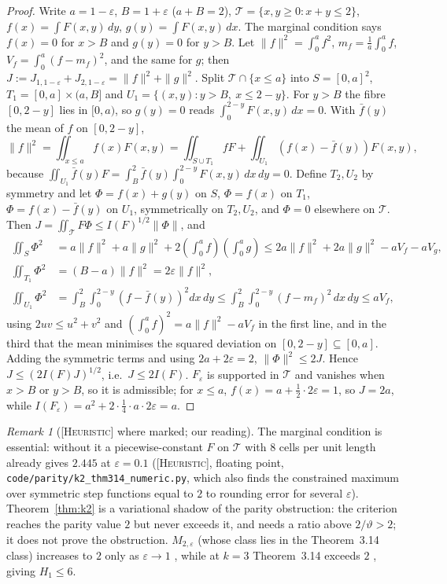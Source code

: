 \documentclass[11pt]{amsart}
\theoremstyle{definition}
\theoremstyle{remark}
\newtheorem{remark}[theorem]{Remark}
\newcommand{\lbl}[1]{\textup{\textsc{[#1]}}}
\begin{document}
\begin{proof}
Write $a=1-\varepsilon$, $B=1+\varepsilon$ ($a+B=2$), $\mathcal T=\{x,y\ge0:x+y\le2\}$,
$f(x)=\int F(x,y)\,dy$, $g(y)=\int F(x,y)\,dx$. The marginal condition says
$f(x)=0$ for $x>B$ and $g(y)=0$ for $y>B$. Let $\|f\|^2=\int_0^af^2$,
$m_f=\frac1a\int_0^af$, $V_f=\int_0^a(f-m_f)^2$, and the same for $g$; then
$J:=J_{1,1-\varepsilon}+J_{2,1-\varepsilon}=\|f\|^2+\|g\|^2$. Split
$\mathcal T\cap\{x\le a\}$ into $S=[0,a]^2$, $T_1=[0,a]\times(a,B]$ and
$U_1=\{(x,y):y>B,\ x\le2-y\}$. For $y>B$ the fibre $[0,2-y]$ lies in $[0,a)$,
so $g(y)=0$ reads $\int_0^{2-y}F(x,y)\,dx=0$. With $\bar f(y)$ the mean of $f$ on
$[0,2-y]$,
\[
\|f\|^2=\iint_{x\le a}f(x)F(x,y)=\iint_{S\cup T_1}fF+\iint_{U_1}\left(f(x)-\bar f(y)\right)F(x,y),
\]
because $\iint_{U_1}\bar f(y)F=\int_B^2\bar f(y)\int_0^{2-y}F(x,y)\,dx\,dy=0$.
Define $T_2,U_2$ by symmetry and let $\Phi=f(x)+g(y)$ on $S$, $\Phi=f(x)$ on
$T_1$, $\Phi=f(x)-\bar f(y)$ on $U_1$, symmetrically on $T_2,U_2$, and $\Phi=0$
elsewhere on $\mathcal T$. Then $J=\iint_{\mathcal T}F\Phi\le I(F)^{1/2}\|\Phi\|$, and
\begin{align*}
\iint_S\Phi^2&=a\|f\|^2+a\|g\|^2+2\left(\textstyle\int_0^af\right)\left(\textstyle\int_0^ag\right)
\le 2a\|f\|^2+2a\|g\|^2-aV_f-aV_g,\\
\iint_{T_1}\Phi^2&=(B-a)\|f\|^2=2\varepsilon\|f\|^2,\\
\iint_{U_1}\Phi^2&=\int_B^2\int_0^{2-y}\left(f-\bar f(y)\right)^2dx\,dy\le\int_B^2\int_0^{2-y}(f-m_f)^2\,dx\,dy\le aV_f,
\end{align*}
using $2uv\le u^2+v^2$ and $(\int_0^af)^2=a\|f\|^2-aV_f$ in the first line, and in
the third that the mean minimises the squared deviation on
$[0,2-y]\subseteq[0,a]$. Adding the symmetric terms and using $2a+2\varepsilon=2$,
$\|\Phi\|^2\le2J$. Hence $J\le(2I(F)J)^{1/2}$, i.e.\ $J\le2I(F)$.
$F_\varepsilon$ is supported in $\mathcal T$ and vanishes when $x>B$ or $y>B$, so it
is admissible; for $x\le a$, $f(x)=a+\frac12\cdot2\varepsilon=1$, so $J=2a$, while
$I(F_\varepsilon)=a^2+2\cdot\frac14\cdot a\cdot2\varepsilon=a$.
\end{proof}

\begin{remark}[\lbl{Heuristic} where marked; our reading]\label{rem:k2}
The marginal condition is essential: without it a piecewise-constant $F$ on
$\mathcal T$ with $8$ cells per unit length already gives $2.445$ at
$\varepsilon=0.1$ (\lbl{Heuristic}, floating point,
\texttt{code/}\allowbreak\texttt{parity/}\allowbreak\texttt{k2\_thm314\_numeric.py}, which
also finds the constrained maximum over symmetric step functions equal to $2$
to rounding error for several $\varepsilon$). Theorem~\ref{thm:k2} is a
variational shadow of the parity obstruction: the criterion reaches the parity
value $2$ but never exceeds it, and needs a ratio above $2/\vartheta>2$; it
does not prove the obstruction. $M_{2,\varepsilon}$ (whose class lies in the
Theorem~3.14 class) increases to $2$ only as $\varepsilon\to1$ \cite[p.~46]{PM8b},
while at $k=3$ Theorem~3.14 exceeds $2$ \cite[Theorem~3.15]{PM8b}, giving
$H_1\le6$.
\end{remark}
\end{document}
